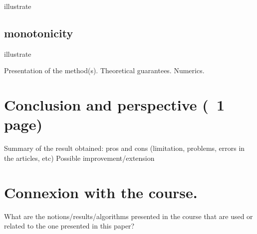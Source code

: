 \documentclass[a4paper,11pt]{article}
\theoremstyle{definition}
\begin{document}
illustrate

\subsection{monotonicity}

illustrate









Presentation of the method(s).
Theoretical guarantees.
Numerics.
\section{Conclusion and perspective (~1 page)}
Summary of the result obtained: pros and cons (limitation, problems, errors in the articles, etc)
Possible improvement/extension
\section{Connexion with the course.}
What are the notions/results/algorithms presented in the course that are used or related to the one presented in this paper?


\printbibliography
\end{document}
